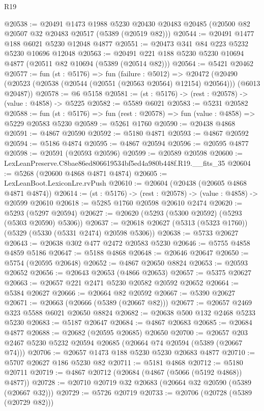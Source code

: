 \begin{lexlean}{R19}
\begin{coremodule}
@20538 := @20491
    @1473
    @1988
    @5230
    @20430
    @20483
    @20485
    (@20500 @82 @20507 @32 @20483 @20517 (@5389 (@20519 @82)))
@20544 := @20491 @1477 @188 @6021 @5230 @12048 @4877
@20551 := @20473 @341 @84 @223 @5232 @5230 @10696 @12048
@20563 := @20491 @221 @188 @5230 @5230 @10694 @4877 (@20511 @82 @10694 (@5389 (@20514 @82)))
@20564 := @5421 @20462
@20577 := fun (st : @5176) =>
  fun (failure : @5012) =>
  @20472 (@20490 (@20523 (@20538 (@20544 (@20551 (@20563 @20564) @12154) @20564))) (@6013 @20487))
@20578 := @6 @5158
@20581 := (st : @5176) -> (rest : @20578) -> (value : @4858) -> @5225
@20582 := @5589 @6021
@20583 := @5231 @20582
@20588 := fun (st : @5176) => fun (rest : @20578) => fun (value : @4858) => @5229 @20583 @5230
@20589 := @5261 @1760
@20590 := @20438 @4868
@20591 := @4867 @20590
@20592 := @5180 @4871
@20593 := @4867 @20592
@20594 := @5186 @4874
@20595 := @4867 @20594
@20596 := @20595 @4877
@20598 := @20591 (@20593 @20596)
@20599 := @20589 @20598
@20600 := LexLeanPreserve.C8bae86ed806619534bf5ed4a980b448f.R19.__fits_35
@20604 := @5268 (@20600 @4868 @4871 @4874)
@20605 := LexLeanBoot.LexiconLre.rvPush
@20610 := @20604 (@20438 (@20605 @4868 @4871 @4874))
@20614 := (st : @5176) -> (rest : @20578) -> (value : @4858) -> @20599 @20610
@20618 := @5285 @1760 @20598 @20610 @2474
@20620 := @5293 (@5297 @20594)
@20627 := @20620 (@5293 (@5300 @20592) (@5293 (@5303 @20590) @5306))
@20637 := @20618 @20627 (@5313 (@5323 @1760)) (@5329 (@5330 (@5331 @2474) @20598 @5306))
@20638 := @5733 @20627
@20643 := @20638 @302 @477 @2472 @20583 @5230
@20646 := @5755 @4858 @4859 @5186
@20647 := @5188 @4868
@20648 := @20646 @20647
@20650 := @5754 (@20595 @20648)
@20652 := @4867 @20650 @8824
@20653 := @20593 @20652
@20656 := @20643 @20653 (@4866 @20653)
@20657 := @5375 @20627
@20663 := @20657 @221 @2471 @5230 @20582 @20592 @20652
@20664 := @5384 @20627
@20666 := @20664 @82 @20592
@20667 := @5390 @20627
@20671 := @20663 (@20666 (@5389 (@20667 @82)))
@20677 := @20657 @2469 @323 @5588 @6021 @20650 @8824
@20682 := @20638 @500 @132 @2468 @5233 @5230
@20683 := @5187 @20647
@20684 := @4867 @20683
@20685 := @20684 @4877
@20688 := @20682 (@20595 @20685) @20650
@20700 := @20657 @203 @2467 @5230 @5232 @20594 @20685 (@20664 @74 @20594 (@5389 (@20667 @74)))
@20706 := @20657 @1473 @188 @5230 @5230 @20683 @4877
@20710 := @5707 @20627 @186 @5230 @82
@20711 := @5181 @4868
@20712 := @5180 @20711
@20719 := @4867 @20712 (@20684 (@4867 (@5066 (@5192 @4868)) @4877))
@20728 := @20710 @20719 @32 @20683 (@20664 @32 @20590 (@5389 (@20667 @32)))
@20729 := @5726 @20719
@20733 := @20706 (@20728 (@5389 (@20729 @82)))

\end{coremodule}
\end{lexlean}
